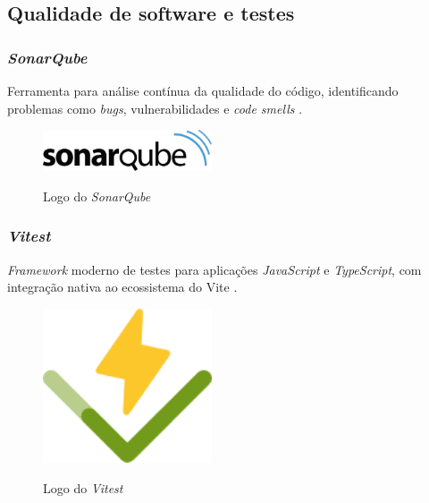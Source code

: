 \subsection{Qualidade de software e testes} 

\subsubsection{\emph{SonarQube}} 
Ferramenta para análise contínua da qualidade do código, identificando problemas como \emph{bugs}, vulnerabilidades e \emph{code smells} \cite{sonarqube}.

\begin{figure}[htb]
	\centering
	\caption{Logo do \emph{SonarQube}}
	\includegraphics[width=5cm]{cap04-desenvolvimento/images/4-4-4-1-sonarqube-logo.png}
	\label{fig:sonarqube-logo}
\end{figure}
\FloatBarrier

\subsubsection{\emph{Vitest}}
\emph{Framework} moderno de testes para aplicações \emph{JavaScript} e \emph{TypeScript}, com integração nativa ao ecossistema do Vite \cite{vitest-2025}.

\begin{figure}[htb]
	\centering
	\caption{Logo do \emph{Vitest}}
	\includegraphics[width=5cm]{cap04-desenvolvimento/images/4-4-4-2-vitest-logo.png}
	\label{fig:vitest-logo}
\end{figure}
\FloatBarrier
